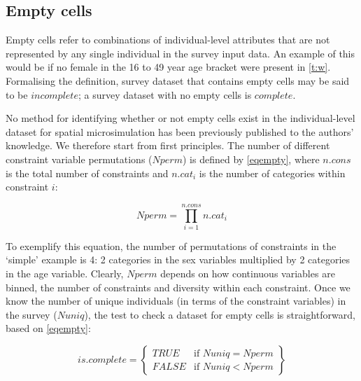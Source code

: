 \documentclass[a4paper,10pt]{article}
\begin{document}
\subsection{Empty cells} \label{smempty}
Empty cells refer to combinations of individual-level 
attributes that are not represented by any single individual 
in the survey input data. An example of this would be if no female 
in the 16 to 49 year age bracket were present in \cref{t:w}.
Formalising the definition,
survey dataset that contains empty cells may be said to be $incomplete$;
a survey dataset with no empty cells is $complete$.

No method for identifying whether or not empty cells exist in the
individual-level dataset for spatial microsimulation has been previously published
to the authors' knowledge. We therefore start from first principles.
The number of different constraint variable permutations ($Nperm$) is defined by \cref{eqempty},
where $n.cons$ is the total number of constraints and $n.cat_i$ is the number of categories
within constraint $i$:

\begin{equation}
\displaystyle Nperm = \prod_{i = 1}^{n.cons} n.cat_{i} 
\label{eqempty}
\end{equation}

To exemplify this equation, the number of permutations of constraints in the
`simple' example is 4: 2 categories in the sex variables multiplied by
2 categories in the age variable. Clearly, $Nperm$ depends on how continuous variables
are binned, the number of constraints and diversity within each constraint.
Once we know the number of unique individuals (in terms of the constraint variables)
in the survey ($Nuniq$), the test to check a dataset for empty cells is straightforward,
based on \cref{eqempty}:

\begin{equation}
is.complete =
\left\{
	\begin{array}{ll}
		TRUE  & \mbox{if } Nuniq = Nperm \\
		FALSE & \mbox{if } Nuniq < Nperm
	\end{array}
\right\}
\end{equation}

\end{document}
